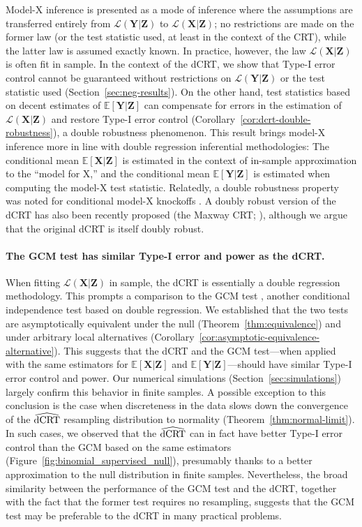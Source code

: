 \documentclass[12pt]{article}
\theoremstyle{definition}
\theoremstyle{remark}
\newcommand{\E}{\mathbb E}								%
\newcommand{\prx}{\bm X}								%
\newcommand{\prz}{\bm Z}								%
\newcommand{\pry}{{\bm Y}}								%
\newcommand{\law}{\mathcal L}							%
\newcommand{\dCRThat}{\widehat{\textnormal{dCRT}}}		%
\begin{document}
Model-X inference \citep{CetL16} is presented as a mode of inference where the assumptions are transferred entirely from $\law(\pry|\prz)$ to $\law(\prx|\prz)$; no restrictions are made on the former law (or the test statistic used, at least in the context of the CRT), while the latter law is assumed exactly known. In practice, however, the law $\law(\prx|\prz)$ is often fit in sample. In the context of the dCRT, we show that Type-I error control cannot be guaranteed without restrictions on $\law(\pry|\prz)$ or the test statistic used (Section~\ref{sec:neg-results}). On the other hand, test statistics based on decent estimates of $\E[\pry|\prz]$ can compensate for errors in the estimation of $\law(\prx|\prz)$ and restore Type-I error control (Corollary~\ref{cor:dcrt-double-robustness}), a double robustness phenomenon. This result brings model-X inference more in line with double regression inferential methodologies: The conditional mean $\E[\prx|\prz]$ is estimated in the context of in-sample approximation to the ``model for X,'' and the conditional mean $\E[\pry|\prz]$ is estimated when computing the model-X test statistic. Relatedly, a double robustness property was noted for conditional model-X knockoffs \citep{Huang2019}. A doubly robust version of the dCRT has also been recently proposed (the Maxway CRT; \cite{Li2022}), although we argue that the original dCRT is itself doubly robust.

\paragraph{The GCM test has similar Type-I error and power as the dCRT.}

When fitting $\law(\prx|\prz)$ in sample, the dCRT is essentially a double regression methodology. This prompts a comparison to the GCM test \citep{Shah2018}, another conditional independence test based on double regression. We established that the two tests are asymptotically equivalent under the null (Theorem~\ref{thm:equivalence}) and under arbitrary local alternatives (Corollary~\ref{cor:asymptotic-equivalence-alternative}). This suggests that the dCRT and the GCM test---when applied with the same estimators for $\E[\prx|\prz]$ and $\E[\pry|\prz]$---should have similar Type-I error control and power. Our numerical simulations (Section~\ref{sec:simulations}) largely confirm this behavior in finite samples. A possible exception to this conclusion is the case when discreteness in the data slows down the convergence of the $\dCRThat$ resampling distribution to normality (Theorem~\ref{thm:normal-limit}). In such cases, we observed that the $\dCRThat$ can in fact have better Type-I error control than the GCM based on the same estimators (Figure~\ref{fig:binomial_supervised_null}), presumably thanks to a better approximation to the null distribution in finite samples. Nevertheless, the broad similarity between the performance of the GCM test and the dCRT, together with the fact that the former test requires no resampling, suggests that the GCM test may be preferable to the dCRT in many practical problems.
\end{document}
